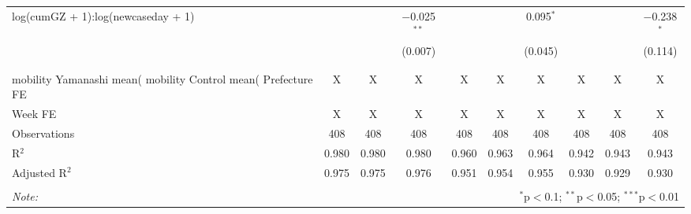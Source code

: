 \begin{table}[!htbp]
\begin{tabular}{@{\extracolsep{5pt}}lccccccccc}
 log(cumGZ + 1):log(newcaseday + 1) &  &  & $-$0.025$^{**}$ &  &  & 0.095$^{*}$ &  &  & $-$0.238$^{*}$ \\ 
  &  &  & (0.007) &  &  & (0.045) &  &  & (0.114) \\ 
  & & & & & & & & & \\ 
\hline \\[-1.8ex] 
mobility Yamanashi mean(%
mobility Control mean(%
Prefecture FE & X & X & X & X & X & X & X & X & X \\ 
Week FE & X & X & X & X & X & X & X & X & X \\ 
Observations & 408 & 408 & 408 & 408 & 408 & 408 & 408 & 408 & 408 \\ 
R$^{2}$ & 0.980 & 0.980 & 0.980 & 0.960 & 0.963 & 0.964 & 0.942 & 0.943 & 0.943 \\ 
Adjusted R$^{2}$ & 0.975 & 0.975 & 0.976 & 0.951 & 0.954 & 0.955 & 0.930 & 0.929 & 0.930 \\ 
\hline 
\hline \\[-1.8ex] 
\textit{Note:}  & \multicolumn{9}{r}{$^{*}$p$<$0.1; $^{**}$p$<$0.05; $^{***}$p$<$0.01} \\ 
\end{tabular} 
\end{table} 
